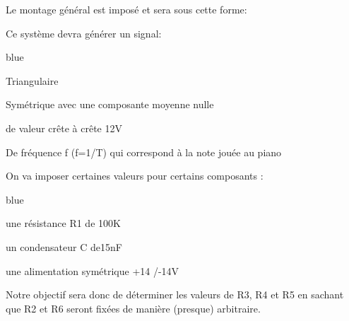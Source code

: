 Le montage général est imposé et sera sous cette forme:


Ce système devra générer un signal:

\begin{items}{blue}{\Bullet}
    \item Triangulaire
    \item Symétrique avec une composante moyenne nulle
    \item de valeur crête à crête 12V
    \item De fréquence f (f=1/T) qui correspond à la note jouée au piano
\end{items}

On va imposer certaines valeurs pour certains composants : 

\begin{items}{blue}{\Bullet}
\item une résistance R1 de 100K
\item un condensateur C de15nF
\item une alimentation symétrique +14 /-14V
\end{items}

Notre objectif sera donc de déterminer les valeurs de R3, R4 et R5 en sachant que R2 et R6 seront fixées de manière (presque) arbitraire.







